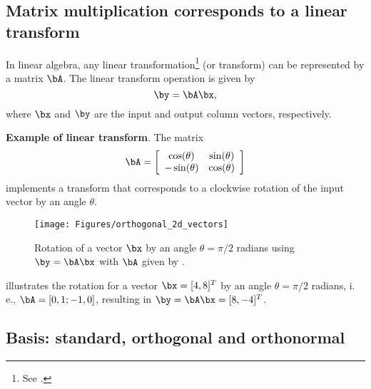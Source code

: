 \subsection{Matrix multiplication corresponds to a linear transform}
\label{sec:transform_as_matrix_mpy}
In linear algebra, any linear transformation\footnote{See .} (or transform)
can be represented by a matrix $\bA$. The linear transform operation is given by
\begin{equation}
\by = \bA \bx,
\label{eq:linear_transform}
\end{equation}
where $\bx$ and $\by$ are the input and output column vectors, respectively. 

\bExample \textbf{Example of linear transform}.
\label{ex:lin_transform}
The matrix
\begin{equation}
\bA =
\left[ \begin{array}{cc}
\cos(\theta) & \sin(\theta)\\
-\sin(\theta) & \cos(\theta)
 \\ \end{array} \right]
\label{eq:mat_rotation}
\end{equation}
implements a transform that corresponds to a clockwise rotation of the input vector by an angle $\theta$.

\begin{figure}[!htb]
        \centering
                \texttt{[image: Figures/orthogonal\_2d\_vectors]}
        \caption{Rotation of a vector $\bx$ by an angle $\theta=\pi/2$ radians using $\by=\bA\bx$ with $\bA$ given by .\label{fig:orthogonal_2d_vectors}}				
\end{figure}
 illustrates the rotation for a vector $\bx=[4, 8]^T$ by an angle $\theta=\pi/2$ radians,  i.\,e., $\bA=[0,1;-1,0]$, resulting in $\by=\bA \bx = [8, -4]^T$.
\eExample

\subsection{Basis: standard, orthogonal and orthonormal}

